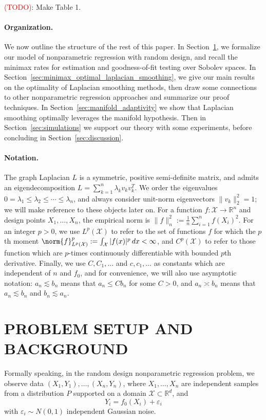 \documentclass[twoside]{article}
\newcommand{\Reals}{\mathbb{R}}
\newcommand{\1}{\mathbf{1}}
\newcommand{\Xset}{\mathcal{X}}
\newcommand{\Leb}{L}
\theoremstyle{definition}
\theoremstyle{remark}
\begin{document}
\textcolor{red}{(TODO)}: Make Table 1. 

\paragraph{Organization.}
We now outline the structure of the rest of this paper. In Section~\ref{sec:problem_setup_and_background}, we formalize our model of nonparametric regression with random design, and recall the minimax rates for estimation and goodness-of-fit testing over Sobolev spaces. In Section~\ref{sec:minimax_optimal_laplacian_smoothing}, we give our main results on the optimality of Laplacian smoothing methods, then draw some connections to other nonparametric regression approaches and summarize our proof techniques. In Section~\ref{sec:manifold_adaptivity} we show that Laplacian smoothing optimally leverages the manifold hypothesis. Then in Section~\ref{sec:simulations} we support our theory with some experiments, before concluding in Section~\ref{sec:discussion}.


\paragraph{Notation.}
The graph Laplacian $L$ is a symmetric, positive semi-definite matrix, and admits an eigendecomposition $L = \sum_{k = 1}^{n} \lambda_k v_k v_k^T$. We order the eigenvalues $0 = \lambda_1 \leq \lambda_2 \leq \cdots \leq \lambda_n$, and always consider unit-norm eigenvectors $\|v_k\|_2^2 = 1$; we will make reference to these objects later on. For a function $f: \Xset \to \Reals^n$ and design points $X_1,\ldots,X_n$, the empirical norm is $\|f\|_n^2 := \frac{1}{n}\sum_{i = 1}^{n} f(X_i)^2$. For an integer $p > 0$, we use $\Leb^p(\Xset)$ to refer to the set of functions $f$ for which the $p$th moment $\norm{f}_{\Leb^p(\Xset)}^p := \int_{\Xset} |f(x)|^p \,dx < \infty$, and $C^p(\Xset)$ to refer to those function which are $p$-times continuously differentiable with bounded $p$th derivative. Finally, we use $C,C_1,\ldots$ and $c,c_1,\ldots$ as constants which are independent of $n$ and $f_0$, and for convenience, we will also use asymptotic notation: $a_n \lesssim b_n$ means that $a_n \leq Cb_n$ for some $C > 0$, and $a_n \asymp b_n$ means that $a_n \lesssim b_n$ and $b_n \lesssim a_n$.

\section{PROBLEM SETUP AND BACKGROUND}
\label{sec:problem_setup_and_background}
Formally speaking, in the random design nonparametric regression problem, we observe data $(X_1,Y_1),\ldots,(X_n,Y_n)$, where $X_1,\ldots,X_n$ are independent samples from a distribution $P$ supported on a domain $\Xset \subset \Reals^d$, and 
\begin{equation}
\label{eqn:random_design_regression}
Y_i = f_0(X_i) + \varepsilon_i
\end{equation}
with $\varepsilon_i \sim N(0,1)$ independent Gaussian noise. 
\end{document}
